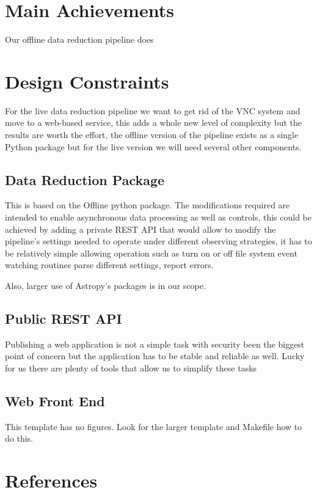 \documentclass[11pt,twoside]{article}
\begin{document}
\section{Main Achievements}

Our offline data reduction pipeline does 

\section{Design Constraints}

For the live data reduction pipeline we want to get rid of the VNC system and move to a web-based service, this adds a whole new level of complexity but the results are worth the effort, the offline version of the pipeline exists as a single Python package but for the live version  we will need several other components.

\subsection{Data Reduction Package}

This is based on the Offline python package. The modifications required are intended to enable asynchronous data processing as well as controls, this could be achieved by adding a private REST API that would allow to modify the pipeline's settings needed to operate under different observing strategies, it has to be relatively simple allowing operation such as turn on or off file system event watching routines parse different settings, report errors.

Also, larger use of Astropy's packages is in our scope.

\subsection{Public REST API}
Publishing a web application is not a simple task with security been the biggest point of concern but the application has to be stable and reliable as well. Lucky for us there are plenty of tools that allow us to simplify these tasks


\subsection{Web Front End}

\acknowledgements

This template has no figures.
Look for the larger template and Makefile how to do this.

\section{References}


\end{document}
